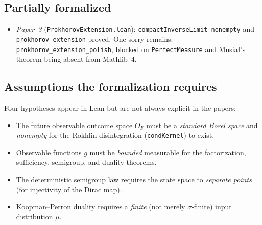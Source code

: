 \documentclass[11pt]{article}
\begin{document}
\subsection*{Partially formalized}

\begin{itemize}
  \item \emph{Paper~3} (\texttt{ProkhorovExtension.lean}):
        \texttt{compactInverseLimit\_nonempty} and
        \texttt{prokhorov\_extension} proved.  One sorry remains:
        \texttt{prokhorov\_extension\_polish}, blocked on
        \texttt{PerfectMeasure} and Musia\l's theorem being absent
        from Mathlib~4.
\end{itemize}

\subsection*{Assumptions the formalization requires}

Four hypotheses appear in Lean but are not always explicit in the papers:
\begin{itemize}
  \item The future observable outcome space $O_F$ must be a
        \emph{standard Borel space} and \emph{nonempty} for the
        Rokhlin disintegration (\texttt{condKernel}) to exist.
  \item Observable functions $g$ must be \emph{bounded} measurable
        for the factorization, sufficiency, semigroup, and duality
        theorems.
  \item The deterministic semigroup law requires the state space to
        \emph{separate points} (for injectivity of the Dirac map).
  \item Koopman--Perron duality requires a \emph{finite} (not merely
        $\sigma$-finite) input distribution $\mu$.
\end{itemize}
\end{document}
